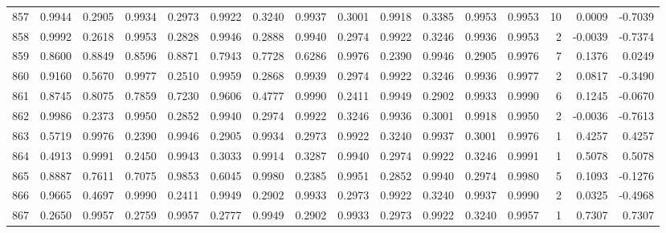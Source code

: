 \begin{tabular}{lrrrrrrrrrrrrrrr}
857 &      0.9944 &  0.2905 &  0.9934 &  0.2973 &  0.9922 &  0.3240 &  0.9937 &  0.3001 &  0.9918 &  0.3385 &   0.9953 &     0.9953 &     10 &                    0.0009 &                    -0.7039 \\
858 &      0.9992 &  0.2618 &  0.9953 &  0.2828 &  0.9946 &  0.2888 &  0.9940 &  0.2974 &  0.9922 &  0.3246 &   0.9936 &     0.9953 &      2 &                   -0.0039 &                    -0.7374 \\
859 &      0.8600 &  0.8849 &  0.8596 &  0.8871 &  0.7943 &  0.7728 &  0.6286 &  0.9976 &  0.2390 &  0.9946 &   0.2905 &     0.9976 &      7 &                    0.1376 &                     0.0249 \\
860 &      0.9160 &  0.5670 &  0.9977 &  0.2510 &  0.9959 &  0.2868 &  0.9939 &  0.2974 &  0.9922 &  0.3246 &   0.9936 &     0.9977 &      2 &                    0.0817 &                    -0.3490 \\
861 &      0.8745 &  0.8075 &  0.7859 &  0.7230 &  0.9606 &  0.4777 &  0.9990 &  0.2411 &  0.9949 &  0.2902 &   0.9933 &     0.9990 &      6 &                    0.1245 &                    -0.0670 \\
862 &      0.9986 &  0.2373 &  0.9950 &  0.2852 &  0.9940 &  0.2974 &  0.9922 &  0.3246 &  0.9936 &  0.3001 &   0.9918 &     0.9950 &      2 &                   -0.0036 &                    -0.7613 \\
863 &      0.5719 &  0.9976 &  0.2390 &  0.9946 &  0.2905 &  0.9934 &  0.2973 &  0.9922 &  0.3240 &  0.9937 &   0.3001 &     0.9976 &      1 &                    0.4257 &                     0.4257 \\
864 &      0.4913 &  0.9991 &  0.2450 &  0.9943 &  0.3033 &  0.9914 &  0.3287 &  0.9940 &  0.2974 &  0.9922 &   0.3246 &     0.9991 &      1 &                    0.5078 &                     0.5078 \\
865 &      0.8887 &  0.7611 &  0.7075 &  0.9853 &  0.6045 &  0.9980 &  0.2385 &  0.9951 &  0.2852 &  0.9940 &   0.2974 &     0.9980 &      5 &                    0.1093 &                    -0.1276 \\
866 &      0.9665 &  0.4697 &  0.9990 &  0.2411 &  0.9949 &  0.2902 &  0.9933 &  0.2973 &  0.9922 &  0.3240 &   0.9937 &     0.9990 &      2 &                    0.0325 &                    -0.4968 \\
867 &      0.2650 &  0.9957 &  0.2759 &  0.9957 &  0.2777 &  0.9949 &  0.2902 &  0.9933 &  0.2973 &  0.9922 &   0.3240 &     0.9957 &      1 &                    0.7307 &                     0.7307 \\

\end{tabular}
